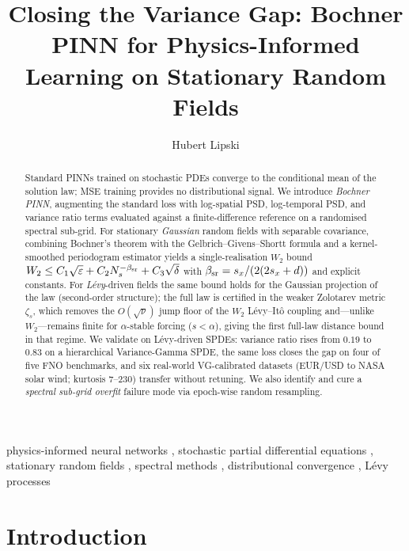 \documentclass[review,12pt]{elsarticle}
\begin{document}
\begin{frontmatter}

\title{Closing the Variance Gap: Bochner PINN for Physics-Informed Learning on Stationary Random Fields}

\author{Hubert Lipski}
\address{Independent Researcher, Poland}

\begin{abstract}
Standard PINNs trained on stochastic PDEs converge to the conditional
mean of the solution law; MSE training provides no distributional
signal.
We introduce \emph{Bochner PINN}, augmenting the standard loss with
log-spatial PSD, log-temporal PSD, and variance ratio terms evaluated
against a finite-difference reference on a randomised spectral
sub-grid.
For stationary \emph{Gaussian} random fields with separable covariance,
combining Bochner's theorem with the Gelbrich--Givens--Shortt formula
and a kernel-smoothed periodogram estimator yields a single-realisation
$W_2$ bound
\(W_2 \le C_1\sqrt{\varepsilon} + C_2 N_s^{-\beta_{\rm sr}} +
C_3\sqrt{\delta}\) with $\beta_{\rm sr} = s_x/(2(2s_x+d))$
and explicit constants. For \emph{L\'evy}-driven fields the same
bound holds for the Gaussian projection of the law (second-order
structure); the full law is certified in the weaker Zolotarev metric
$\zeta_s$, which removes the $O(\sqrt{\nu})$ jump floor of the
$W_2$ L\'evy--It\^o coupling and---unlike $W_2$---remains finite for
$\alpha$-stable forcing ($s < \alpha$), giving the first full-law
distance bound in that regime.
We validate on L\'evy-driven SPDEs: variance ratio rises from
\(0.19\) to \(0.83\) on a hierarchical Variance-Gamma SPDE, the same
loss closes the gap on four of five FNO benchmarks, and six
real-world VG-calibrated datasets (EUR/USD to NASA solar wind;
kurtosis \(7\)--\(230\)) transfer without retuning.
We also identify and cure a \emph{spectral sub-grid overfit} failure
mode via epoch-wise random resampling.
\end{abstract}

\begin{keyword}
physics-informed neural networks \sep
stochastic partial differential equations \sep
stationary random fields \sep
spectral methods \sep
distributional convergence \sep
L\'evy processes
\end{keyword}

\end{frontmatter}

\section{Introduction}
\label{sec:intro}
\end{document}
